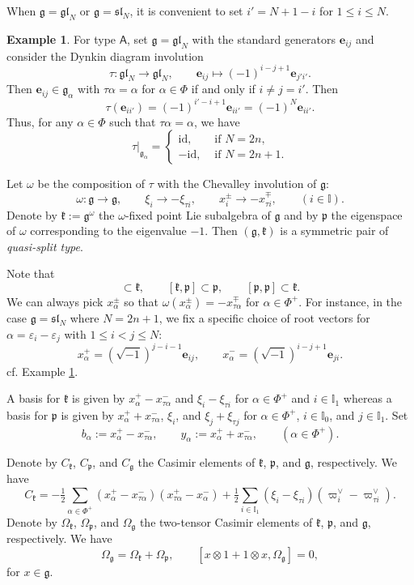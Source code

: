 \documentclass[11pt,reqno]{amsart}
\numberwithin{equation}{section}
\theoremstyle{definition}
\newtheorem{eg}[thm]{Example}
\theoremstyle{remark}
\newcommand{\beq}{\begin{equation}}
\newcommand{\eeq}{\end{equation}}
\newcommand{\be}{\begin{equation*}}
\newcommand{\ee}{\end{equation*}}
\newcommand{\g}{\mathfrak{g}}
\newcommand{\gl}{\mathfrak{gl}}
\newcommand{\fksl}{\mathfrak{sl}}
\newcommand{\lle}{\leqslant}
\newcommand{\I}{{\mathbb I}}
\newcommand{\ve}{\varepsilon}
\begin{document}
When $\g=\gl_N$ or $\g=\fksl_N$, it is convenient to set $i'=N+1-i$ for $1\lle i\lle N$.

\begin{eg}\label{eg:A2n}
For type $\mathsf A$, set $\g=\gl_N$ with the standard generators $\mathbf e_{ij}$ and consider the Dynkin diagram involution 
\[
\tau:\gl_N\to \gl_N,\qquad \mathbf e_{ij}\mapsto (-1)^{i-j+1}\mathbf e_{j'i'}.
\]
Then $\mathbf e_{ij}\in \g_\alpha$ with $\tau\alpha=\alpha$ for $\alpha\in\Phi$ if and only if $i\ne j=i'$. Then
\[
\tau(\mathbf e_{ii'})=(-1)^{i'-i+1}\mathbf e_{ii'}=(-1)^N\mathbf e_{ii'}.
\]
Thus, for any $\alpha\in\Phi$ such that $\tau \alpha=\alpha$, we have
\[
\tau|_{\g_\alpha} =
\begin{cases}
   \mathrm{id}, &\text{ if }N=2n,\\
   - \mathrm{id}, &\text{ if }N=2n+1.  
\end{cases}
\]
\end{eg}

Let $\omega$ be the composition of $\tau$ with the Chevalley involution of $\g$:
\beq\label{omega}
\omega:\g\to\g,\qquad \xi_i\to -\xi_{\tau i},\qquad x_i^\pm \to -x_{\tau i}^\mp,\qquad (i\in \I).
\eeq
Denote by $\mathfrak k:=\g^\omega$ the $\omega$-fixed point Lie subalgebra of $\g$ and by $\mathfrak p$ the eigenspace of $\omega$ corresponding to the eigenvalue $-1$. Then $(\g,\mathfrak k)$ is a symmetric pair of \textit{quasi-split type}. 

Note that 
\be
[\mathfrak k,\mathfrak k]\subset \mathfrak k,\qquad [\mathfrak k,\mathfrak p]\subset \mathfrak p,\qquad [\mathfrak p,\mathfrak p]\subset \mathfrak k.
\ee
We can always pick $x_\alpha^\pm$ so that $\omega(x_\alpha^\pm)=-x_{\tau \alpha}^\mp$ for $\alpha\in\Phi^+$. For instance, in the case $\g=\mathfrak{sl}_{N}$ where $N=2n+1$, we fix a specific choice of root vectors for $\alpha=\ve_i-\ve_j$ with $1\lle i<j\lle N$:
\beq\label{eq:rt-A2n0}
x_\alpha^+=(\sqrt{-1})^{j-i-1}\mathbf e_{ij},\qquad x_\alpha^-=(\sqrt{-1})^{i-j+1}\mathbf e_{ji}.
\eeq
cf. Example \ref{eg:A2n}.

A basis for $\mathfrak k$ is given by $x_{\alpha}^+-x_{\tau \alpha}^-$ and $\xi_i-\xi_{\tau i}$ for $\alpha\in\Phi^+$ and  $i\in \I_1$ whereas a basis for $\mathfrak p$ is given by $x_{\alpha}^++x_{\tau \alpha}^-$, $\xi_i$, and $\xi_j+\xi_{\tau j}$ for $\alpha\in\Phi^+$, $i\in \I_0$, and $j\in \I_1$. Set
\be
b_{\alpha}:=x_{\alpha}^+-x_{\tau\alpha}^-,\qquad  y_{\alpha}:=x_{\alpha}^++x_{\tau\alpha}^-,\qquad (\alpha\in\Phi^+).
\ee

Denote by $C_{\mathfrak k}$, $C_{\mathfrak p}$, and $C_{\g}$ the Casimir elements of $\mathfrak k$, $\mathfrak p$, and $\g$, respectively. We have
\be
C_{\mathfrak k}=-\tfrac12\sum_{\alpha\in\Phi^+}(x_{\alpha}^+-x_{\tau \alpha}^-)(x_{\tau\alpha}^+ - x_{\alpha}^-)+ \tfrac12\sum_{i\in \I_1}(\xi_i-\xi_{\tau i})(\varpi_i^\vee-\varpi_{\tau i}^\vee).
\ee
Denote by $\Omega_{\mathfrak k}$, $\Omega_{\mathfrak p}$, and $\Omega_{\g}$ the two-tensor Casimir elements of $\mathfrak k$, $\mathfrak p$, and $\g$, respectively. We have
\be
\Omega_{\g}= \Omega_{\mathfrak k}+\Omega_{\mathfrak p}, \qquad [x\otimes 1+1\otimes x,\Omega_\g]=0,
\ee
for $x\in\g$.
\end{document}
